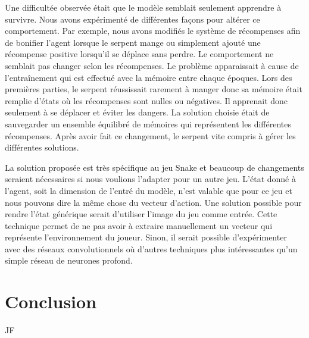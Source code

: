 \documentclass{article}
\begin{document}
Une difficultée observée était que le modèle semblait seulement apprendre à survivre. Nous avons expérimenté de différentes façons pour altérer ce comportement. Par exemple, nous avons modifiés le système de récompenses afin de bonifier l’agent lorsque le serpent mange ou simplement ajouté une récompense positive lorsqu’il se déplace sans perdre. Le comportement ne semblait pas changer selon les récompenses. Le problème apparaissait à cause de l’entraînement qui est effectué avec la mémoire entre chaque époques. Lors des premières parties, le serpent réussissait rarement à manger donc sa mémoire était remplie d’états où les récompenses sont nulles ou négatives. Il apprenait donc seulement à se déplacer et éviter les dangers. La solution choisie était de sauvegarder un ensemble équilibré de mémoires qui représentent les différentes récompenses. Après avoir fait ce changement, le serpent vite compris à gérer les différentes solutions.

La solution proposée est très spécifique au jeu Snake et beaucoup de changements seraient nécessaires si nous voulions l’adapter pour un autre jeu. L’état donné à l’agent, soit la dimension de l’entré du modèle, n’est valable que pour ce jeu et nous pouvons dire la même chose du vecteur d’action. Une solution possible pour rendre l’état générique serait d’utiliser l’image du jeu comme entrée. Cette technique permet de ne pas avoir à extraire manuellement un vecteur qui représente l’environnement du joueur. Sinon, il serait possible d’expérimenter avec des réseaux convolutionnels où d’autres techniques plus intéressantes qu’un simple réseau de neurones profond.

\section{Conclusion}

JF

\printbibliography
\end{document}
